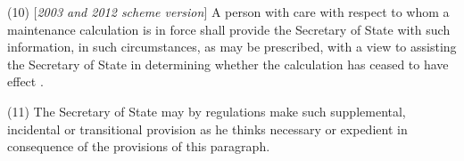 \documentclass[12pt,a4paper]{article}
\begin{document}
(10) [\emph{2003 and 2012 scheme version}] A person with care with respect to whom a 
maintenance calculation  %
is in force shall provide the 
Secretary of State  %
with such information, in such circumstances, as may be prescribed, with a view to assisting the 
Secretary of State  %
in determining whether the 
calculation  %
has ceased to have effect%
.

(11) The Secretary of State may by regulations make such supplemental, incidental or transitional provision as he thinks necessary or expedient in consequence of the provisions of this paragraph.
\end{document}

